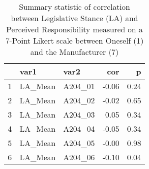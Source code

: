 \begin{table}[ht]
\centering
\begin{tabular}{rllrr}
  \hline
 & var1 & var2 & cor & p \\ 
  \hline
1 & LA\_Mean & A204\_01 & -0.06 & 0.24 \\ 
  2 & LA\_Mean & A204\_02 & -0.02 & 0.65 \\ 
  3 & LA\_Mean & A204\_03 & 0.05 & 0.34 \\ 
  4 & LA\_Mean & A204\_04 & -0.05 & 0.34 \\ 
  5 & LA\_Mean & A204\_05 & -0.00 & 0.98 \\ 
  6 & LA\_Mean & A204\_06 & -0.10 & 0.04 \\ 
   \hline
\end{tabular}
\caption{Summary statistic of correlation between Legislative Stance (LA) and Perceived Responsibility measured on a 7-Point Likert scale between Oneself (1) and the Manufacturer (7)} 
\label{RQ1_H3_ResponsibilityLA}
\end{table}
